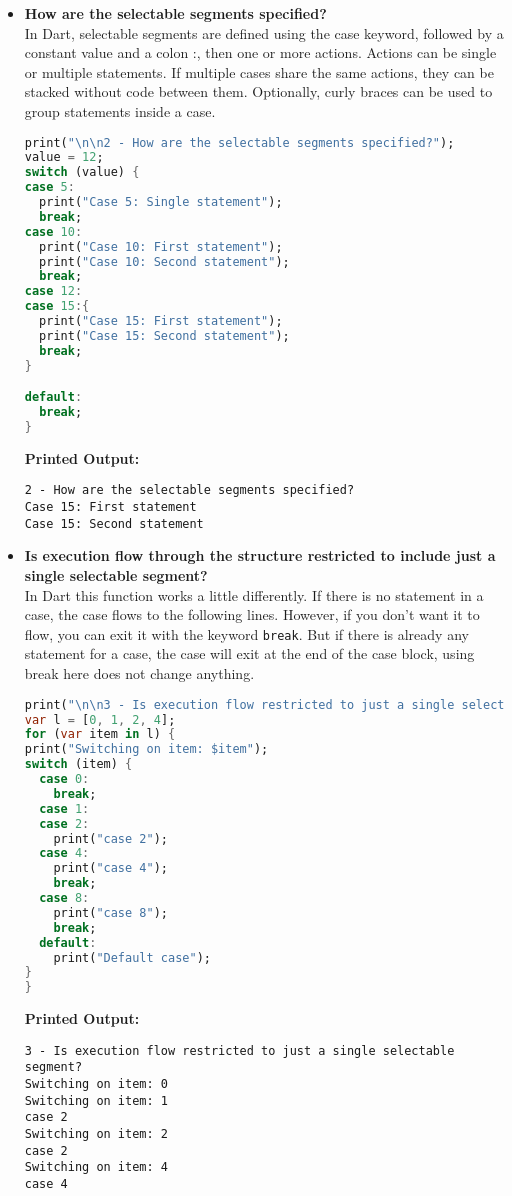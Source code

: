 \documentclass{article}
\begin{document}
\begin{itemize}
\item \textbf{How are the selectable segments specified?} \\
In Dart, selectable segments are defined using the case keyword, followed by a constant value and a colon :, then one or more actions. Actions can be single or multiple statements. If multiple cases share the same actions, they can be stacked without code between them. Optionally, curly braces {} can be used to group statements inside a case.

\begin{lstlisting}[language=Dart]
print("\n\n2 - How are the selectable segments specified?");
value = 12;
switch (value) {
case 5:
  print("Case 5: Single statement");
  break;
case 10:
  print("Case 10: First statement");
  print("Case 10: Second statement");
  break;
case 12:
case 15:{
  print("Case 15: First statement");
  print("Case 15: Second statement");
  break;
}

default:
  break;
}
\end{lstlisting}
\textbf{Printed Output:} 
\begin{verbatim}
2 - How are the selectable segments specified?
Case 15: First statement
Case 15: Second statement
\end{verbatim}





\item \textbf{Is execution flow through the structure restricted to include just a single selectable segment?} \\
In Dart this function works a little differently. If there is no statement in a case, the case flows to the following lines. However, if you don't want it to flow, you can exit it with the keyword \texttt{break}. But if there is already any statement for a case, the case will exit at the end of the case block, using break here does not change anything. 
\begin{lstlisting}[language=Dart]
print("\n\n3 - Is execution flow restricted to just a single selectable segment?");
var l = [0, 1, 2, 4];
for (var item in l) {
print("Switching on item: $item");
switch (item) {
  case 0:
    break;
  case 1:
  case 2:
    print("case 2");
  case 4:
    print("case 4");
    break;
  case 8:
    print("case 8");
    break;
  default:
    print("Default case");
}
}
\end{lstlisting}
\textbf{Printed Output:} 
\begin{verbatim}
3 - Is execution flow restricted to just a single selectable segment?
Switching on item: 0
Switching on item: 1
case 2
Switching on item: 2
case 2
Switching on item: 4
case 4
\end{verbatim}






\end{itemize}
\end{document}
